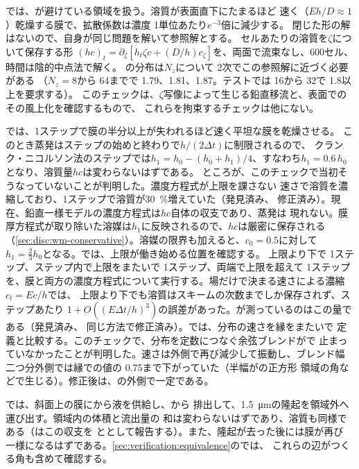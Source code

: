 では、が避けている領域を扱う。溶質が表面直下にたまるほど
速く（$Eh/D \approx 1$）乾燥する膜で、拡散係数は濃度 1単位あたり$e^{-3}$倍に減少する。
閉じた形の解はないので、自身が同じ問題を解いて参照解とする。
セルあたりの溶質を$\zeta$について保存する形
$(hc)_t = \partial_\zeta[h_t\zeta c
+ (D/h)c_\zeta]$を、両面で流束なし、600セル、時間は陰的中点法で解く。
の分布は$N_z$について 2次でこの参照解に近づく必要がある
（$N_z = 8$から 64までで 1.79、1.81、1.87。テストでは 16から 32で 1.8以上を要求する）。
このチェックは、$\zeta$写像によって生じる鉛直移流と、表面でのその風上化を確認するもので、
これらを拘束するチェックは他にない。

では、1ステップで膜の半分以上が失われるほど速く平坦な膜を乾燥させる。
このとき蒸発はステップの始めと終わりで$h/(2\Delta t)$に制限されるので、
クランク・ニコルソン法のステップでは$h_1 = h_0 -
(h_0 + h_1)/4$、すなわち$h_1 = 0.6\,h_0$となり、溶質量$hc$は変わらないはずである。
ところが、このチェックで当初そうなっていないことが判明した。濃度方程式が上限を課さない
速さで溶質を濃縮しており、1ステップで溶質が\SI{30}{\percent}増えていた（発見済み、
修正済み）。現在、鉛直一様モデルの濃度方程式は$hc$自体の収支であり、蒸発は
現れない。膜厚方程式が取り除いた溶媒は$h_1$に反映されるので、$hc$は厳密に保存される
（\cref{sec:disc:wm-conservative}）。溶媒の限界も加えると、$c_0 = 0.5$に対して
$h_1 = \tfrac23 h_0$となる。では、上限が働き始める位置を確認する。
上限より下で 1ステップ、ステップ内で上限をまたいで 1ステップ、両端で上限を超えて
1ステップを、膜と両方の濃度方程式について実行する。場だけで決まる速さによる濃縮$c_t = Ec/h$では、
上限より下でも溶質はスキームの次数までしか保存されず、ステップあたり
$1 + O((E\Delta t/h)^3)$の誤差があった。が測っているのはこの量である（発見済み、
同じ方法で修正済み）。では、分布の速さを縁をまたいで
定義と比較する。このチェックで、分布を定数につなぐ余弦ブレンドがで
止まっていなかったことが判明した。速さは外側で再び減少して振動し、ブレンド幅
二つ分外側では縁での値の 0.75まで下がっていた（半幅がの正方形
領域の角などで生じる）。修正後は、の外側で一定である。

では、斜面上の膜にから液を供給し、から
排出して、\SI{1.5}{\micro\metre}の隆起を領域外へ運び出す。領域内の体積と流出量の
和は変わらないはずであり、溶質も同様である（はこの収支を
ととして報告する）。また、隆起が去った後には膜が再び
一様になるはずである。\cref{sec:verification:equivalence}のでは、
これらの辺がつくる角も含めて確認する。

